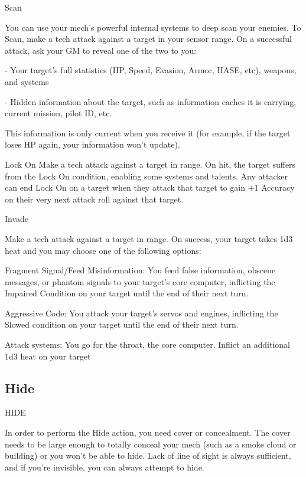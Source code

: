 Scan
 
You can use your mech’s powerful internal systems to deep scan your enemies.  
To Scan, make a tech attack against a target in your sensor range. On a successful attack, ask  
your GM to reveal one of the two to you:
 
             -   Your target’s full statistics (HP, Speed, Evasion, Armor, HASE, etc), weapons, and  
                 systems
 
             -   Hidden information about the target, such as information caches it is carrying,  
                 current mission, pilot ID, etc. 
 
This information is only current when you receive it (for example, if the target loses HP again,  
your information won’t update).
 

Lock On  
Make a tech attack against a target in range. On hit, the target suffers from the Lock On  
condition, enabling some systems and talents. Any attacker can end Lock On on a target when  
they attack that target to gain +1 Accuracy on their very next attack roll against that target.
 

Invade
 
Make a tech attack against a target in range. On success, your target takes 1d3 heat and you  
may choose one of the following options:
 

                                                                                                                


         Fragment Signal/Feed Misinformation: You feed false information, obscene messages,  
         or phantom signals to your target’s core computer, inflicting the Impaired Condition on  
         your target until the end of their next turn.
 

         Aggressive Code: You attack your target’s servos and engines, inflicting the Slowed  
         condition on your target until the end of their next turn.
 

         Attack systems: You go for the throat, the core computer. Inflict an additional 1d3 heat  
         on your target
 
\subsection{Hide}

                                                      HIDE  

In order to perform the Hide action, you need cover or concealment. The cover needs to be large  
enough to totally conceal your mech (such as a smoke cloud or building) or you won’t be able to  
hide. Lack of line of sight is always sufficient, and if you’re invisible, you can always attempt to  
hide.
 

